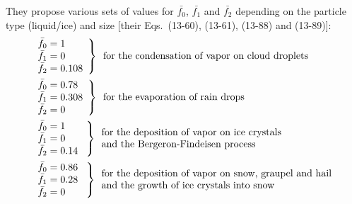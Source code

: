 {They propose various sets of values for $\bar{f_0}$, $\bar{f_1}$ and $\bar{f_2}$ depending on the particle type (liquid/ice) and size [their Eqs.\ (13-60), (13-61), (13-88) and (13-89)]:
\begin{align}
 &\left.
  \begin{array}{l l}
    \bar{f_0} = 1 \\
    \bar{f_1} = 0 \\
    \bar{f_2} = 0.108
  \end{array} \right\}
  \begin{array}{l l}
    \text{for the condensation of vapor on cloud droplets}
  \end{array} \\
%
  &\left.
  \begin{array}{l l}
    \bar{f_0} = 0.78 \\
    \bar{f_1} = 0.308 \\
    \bar{f_2} = 0
  \end{array} \right\}
  \begin{array}{l l}
    \text{for the evaporation of rain drops}
  \end{array} \\
%
  &\left.
  \begin{array}{l l}
    \bar{f_0} = 1 \\
    \bar{f_1} = 0 \\
    \bar{f_2} = 0.14~
  \end{array} \right\}
  \begin{array}{l l}
    \text{for the deposition of vapor on ice crystals} \\
    \text{and the Bergeron-Findeisen process}
  \end{array} \\
%
  &\left.
  \begin{array}{l l}
    \bar{f_0} = 0.86~ \\
    \bar{f_1} = 0.28 \\
    \bar{f_2} = 0 
  \end{array} \right\}
  \begin{array}{l l}
    \text{for the deposition of vapor on snow, graupel and hail} \\
    \text{and the growth of ice crystals into snow}
  \end{array} \\
\end{align}

}
